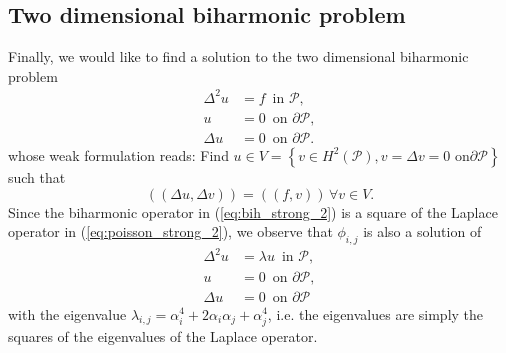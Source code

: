 \documentclass[a4paper,10pt]{article}
\newcommand{\Inner}[2]{\ensuremath{\left(\left(#1, #2\right)\right)}}
\begin{document}
  \subsection{Two dimensional biharmonic problem}
  Finally, we would like to find a solution to the two dimensional biharmonic
  problem
  \begin{equation}
  \label{eq:bih_strong_2}
  \begin{aligned}
    \Delta^2 u &= f\,\text{ in }\mathcal{P},\\
            u &= 0\,\text{ on }\partial\mathcal{P},\\
    \Delta u &= 0\,\text{ on }\partial\mathcal{P}.
  \end{aligned}
  \end{equation}
  whose weak formulation reads: Find $u\in V=\left\{v\in
    H^2\left(\mathcal{P}\right), v=\Delta{v}=0\text{ on
}\partial\mathcal{P}\right\}$ such that 
  \begin{equation}
  \label{eq:bih_weak_2}
  \Inner{\Delta u}{\Delta v} = \Inner{f}{v}\,\forall v \in V.
  \end{equation}
  Since the biharmonic operator in (\ref{eq:bih_strong_2}) is a square of the
  Laplace operator in (\ref{eq:poisson_strong_2}), we observe that $\phi_{i, j}$
  is also a solution of
  \[
  \begin{aligned}
    \Delta^2 u &= \lambda u \,\text{ in }\mathcal{P},\\
            u &= 0\,\text{ on }\partial\mathcal{P},\\
    \Delta u &= 0\,\text{ on }\partial\mathcal{P}
  \end{aligned}
  \]
  with the eigenvalue $\lambda_{i, j} = \alpha_i^4 + 2\alpha_i\alpha_j +
  \alpha_j^4$, i.e. the eigenvalues are simply the squares of the
  eigenvalues of the Laplace operator.
\end{document}

